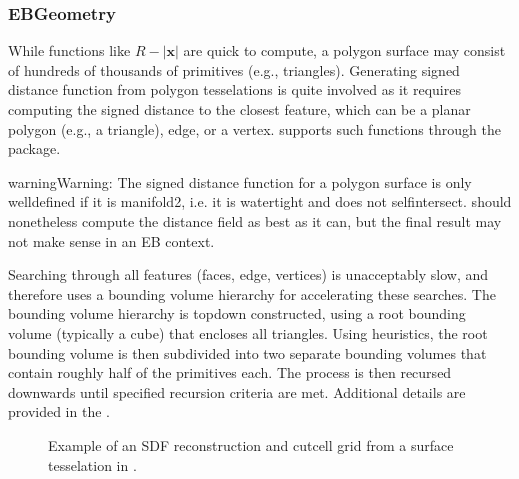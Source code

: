 \documentclass[letterpaper,10pt,english]{sphinxmanual}
\let\sphinxpxdimen\pdfpxdimen\else\newdimen\sphinxpxdimen
\begin{document}
\subsubsection{EBGeometry}
\label{\detokenize{Source/SpatialDiscretization:ebgeometry}}
\sphinxAtStartPar
While functions like \(R - \left|\mathbf{x}\right|\) are quick to compute, a polygon surface may consist of hundreds of thousands of primitives (e.g., triangles).
Generating signed distance function from polygon tesselations is quite involved as it requires computing the signed distance to the closest feature, which can be a planar polygon (e.g., a triangle), edge, or a vertex.
 supports such functions through the  package.

\begin{sphinxadmonition}{warning}{Warning:}
\sphinxAtStartPar
The signed distance function for a polygon surface is only well\sphinxhyphen{}defined if it is manifold\sphinxhyphen{}2, i.e. it is watertight and does not self\sphinxhyphen{}intersect.
 should nonetheless compute the distance field as best as it can, but the final result may not make sense in an EB context.
\end{sphinxadmonition}

\sphinxAtStartPar
Searching through all features (faces, edge, vertices) is unacceptably slow, and  therefore uses a bounding volume hierarchy for accelerating these searches.
The bounding volume hierarchy is top\sphinxhyphen{}down constructed, using a root bounding volume (typically a cube) that encloses all triangles.
Using heuristics, the root bounding volume is then subdivided into two separate bounding volumes that contain roughly half of the primitives each.
The process is then recursed downwards until specified recursion criteria are met.
Additional details are provided in the .

\begin{figure}[htb]
\centering
\capstart

\noindent\sphinxincludegraphics[width=360\sphinxpxdimen]{{Armadillo}.png}
\caption{Example of an SDF reconstruction and cut\sphinxhyphen{}cell grid from a surface tesselation in .}\label{\detokenize{Source/SpatialDiscretization:id9}}\end{figure}
\end{document}
